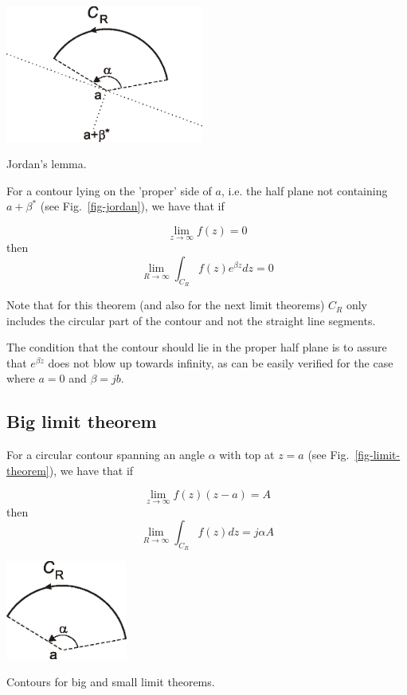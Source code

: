 \begin{marginfigure}
\centering
\includegraphics[width=6.5cm]{complex/figures/jordan}
\caption{Jordan's lemma.}
\label{fig-jordan}
\end{marginfigure}

For a contour lying on the 'proper' side of $a$, i.e. the half plane not
containing $a+\beta^*$ (see Fig.~\ref{fig-jordan}), we have that if  

\begin{equation}
\lim_{z \to \infty} f(z) = 0
\end{equation}
then
\begin{equation}
\lim_{R \to \infty} \int_{{C}_R} f(z) e^{\beta z} dz = 0
\end{equation}


Note that for this theorem (and also for the next limit theorems)
${{C}_R}$ only includes the circular part of the contour and not the
straight line segments.

The condition that the contour should lie in the proper half plane is to assure
that $e^{\beta z}$ does not blow up towards infinity, as can be easily verified
for the case where $a=0$ and $\beta=jb$.

\subsection*{Big limit theorem}

For a circular contour spanning an angle $\alpha$ with top at $z=a$ (see
Fig.~\ref{fig-limit-theorem}), we have that if

\begin{equation}
\lim_{z \to \infty}  f(z) (z-a) = A
\end{equation}
then
\begin{equation}
\lim_{R \to \infty} \int_{{C}_R} f(z) dz = j \alpha A
\end{equation}

\begin{marginfigure}
\centering
\includegraphics[width=4cm]{complex/figures/limit_theorem}
\caption{Contours for big and small limit theorems.}
\label{fig-limit-theorem}
\end{marginfigure}

